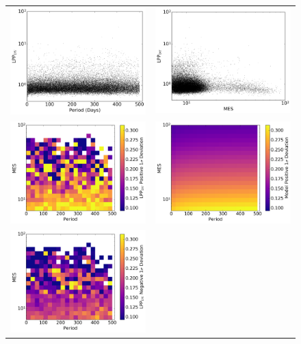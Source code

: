 \begin{figure}
\centering
\begin{tabular}{cc}
\includegraphics[width=0.5\linewidth]{ScoreFig-1.png} &
\includegraphics[width=0.5\linewidth]{ScoreFig-2.png} \\
\includegraphics[width=0.5\linewidth]{ScoreFig-3.png} &
\includegraphics[width=0.5\linewidth]{ScoreFig-4.png} \\
\includegraphics[width=0.5\linewidth]{ScoreFig-5.png} &

\end{tabular}
\end{figure}
